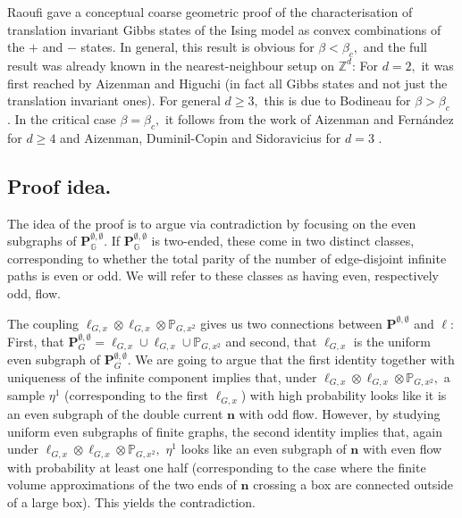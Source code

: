 \documentclass[article,11pt,reqno]{amsart}
\newcommand{\Z}{\mathbb{Z}}
\newcommand{\nn}{\mathbf{n}}
\begin{document}
Raoufi gave a conceptual coarse geometric proof of the characterisation of translation invariant Gibbs states of the Ising model as convex combinations of the $+$ and $-$ states. In general, this result is obvious for $\beta<\beta_c,$ and the full result was already known in the nearest-neighbour setup on $\Z^d$:
For $d=2,$ it was first reached by Aizenman \cite{aizenman1980translation} and Higuchi \cite{higuchi1981absence} (in fact all Gibbs states and not just the translation invariant ones). For general $d\geq 3,$ this is due to Bodineau for $\beta > \beta_c$ \cite{bodineau2006translation}.  In the critical case $\beta = \beta_c,$ it follows from the work of Aizenman and Fernández \cite{aizenman1986critical} for $d \geq 4$ and Aizenman, Duminil-Copin and Sidoravicius for $d=3$ \cite{aizenman2015random}.


\subsection{Proof idea.} The idea of the proof is to argue via contradiction by focusing on the even subgraphs of $\mathbf{P}^{\emptyset,\emptyset}_{\mathbb{G}}$. If $\mathbf{P}^{\emptyset,\emptyset}_{\mathbb{G}}$ is two-ended, these come in two distinct classes, corresponding to whether the total parity of the number of edge-disjoint infinite paths is even or odd. We will refer to these classes as having even, respectively odd, flow.

The coupling $\ell_{G,x}\otimes \ell_{G,x}\otimes \mathbb{P}_{G,x^2}$ gives us two connections between $\mathbf{P}^{\emptyset,\emptyset}$ and $\ell$: First, that $\mathbf{P}^{\emptyset,\emptyset}_{G}=\ell_{G,x}\cup \ell_{G,x}\cup \mathbb{P}_{G,x^2}$ and second, that $\ell_{G,x}$ is the uniform even subgraph of $\mathbf{P}^{\emptyset,\emptyset}_{G}$. We are going to argue that the first identity together with uniqueness of the infinite component implies that, under $\ell_{G,x}\otimes \ell_{G,x}\otimes \mathbb{P}_{G,x^2},$ a sample $\eta^1$ (corresponding to the first $\ell_{G,x}$)  with high probability looks like it is an even subgraph of the double current $\nn$ with odd flow. However, by studying uniform even subgraphs of finite graphs, the second identity implies that, again under $\ell_{G,x}\otimes \ell_{G,x}\otimes \mathbb{P}_{G,x^2},$ $\eta^1$ looks like an even subgraph of $\nn$ with even flow with probability at least one half (corresponding to the case where the finite volume approximations of the two ends of $\nn$ crossing a box are connected outside of a large box). This yields the contradiction.
\end{document}

